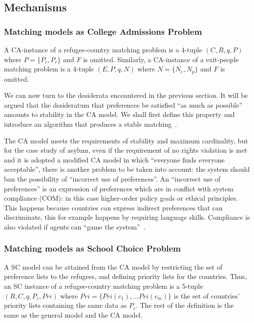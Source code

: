 \subsection{Mechanisms}\label{mechanisms}

\subsubsection{Matching models as College Admissions Problem}\label{matching-model-as-college-admissions-problem}
A CA-instance of a refugee-country matching problem is a 4-tuple \((C, R, q, P)\) where \(P = \{ P_c, P_r\}\) and \(F\) is omitted.
Similarly, a CA-instance of a exit-people matching problem is a 4-tuple \((E, P, q, N)\) where \(N = \{ N_e ,  N_p\}\) and \(F\) is omitted.

We can now turn to the desiderata encountered in the previous section.
It will be argued that the desideratum that preferences be satisfied “as much as possible” amounts to stability in the CA
model.
We shall first define this property and introduce an algorithm that produces a stable matching~\cite{basshuysen}.

The CA model meets the requirements of stability and maximum cardinality, but for the case study of asylum, even if the requirement of no rights violation is met and it is adopted a modified CA model in which “everyone finds everyone acceptable”, there is another problem to be taken into account: the system should ban the possibility of “incorrect use of preferences”.
An “incorrect use of preferences” is an expression of preferences which are in conflict with system compliance (COM): in this case higher-order policy goals or ethical principles.
This happens because countries can express indirect preferences that can discriminate, this for example happens by requiring language skills.
Compliance is also violated if agents can “game the system”~\cite{basshuysen}.

\subsubsection{Matching models as School Choice Problem}\label{matching-model-as-school-choice-problem}
A SC model can be attained from the CA model by restricting the set of preference lists to the refugees, and defining priority lists for the countries.
Thus, an SC instance of a refugee-country matching problem is a 5-tuple \((R, C, q, P_r, Pri)\) where \(Pri = \{Pri(c_1), \ldots Pri(c_m)\}\) is the set of countries’ priority lists containing the same data as \(P_c\).
The rest of the definition is the same as the general model and the CA model.

